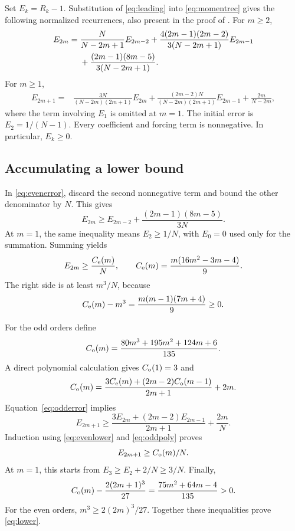 \documentclass[11pt]{article}
\theoremstyle{definition}
\theoremstyle{remark}
\newcommand{\1}{\mathbf 1}
\begin{document}
Set $E_k=R_k-1$. Substitution of \eqref{eq:leading} into \eqref{eq:momentrec} gives the following normalized recurrences, also present in the proof of \cite[Proposition 3.3]{CN}. For $m\ge2$,
\begin{align}
E_{2m}={}&\frac{N}{N-2m+1}E_{2m-2}
+\frac{4(2m-1)(2m-2)}{3(N-2m+1)}E_{2m-1}\notag\\
&+\frac{(2m-1)(8m-5)}{3(N-2m+1)}.\label{eq:evenerror}
\end{align}
For $m\ge1$,
\begin{align}
E_{2m+1}={}&\frac{3N}{(N-2m)(2m+1)}E_{2m}
+\frac{(2m-2)N}{(N-2m)(2m+1)}E_{2m-1}
+\frac{2m}{N-2m},\label{eq:odderror}
\end{align}
where the term involving $E_1$ is omitted at $m=1$. The initial error is $E_2=1/(N-1)$. Every coefficient and forcing term is nonnegative. In particular, $E_k\ge0$.

\subsection{Accumulating a lower bound}

In \eqref{eq:evenerror}, discard the second nonnegative term and bound the other denominator by $N$. This gives
\[
E_{2m}\ge E_{2m-2}+\frac{(2m-1)(8m-5)}{3N}.
\]
At $m=1$, the same inequality means $E_2\ge1/N$, with $E_0=0$ used only for the summation. Summing yields
\begin{equation}\label{eq:evenlower}
E_{2m}\ge\frac{C_{\rm e}(m)}N,
\qquad C_{\rm e}(m)=\frac{m(16m^2-3m-4)}9.
\end{equation}
The right side is at least $m^3/N$, because
\[
C_{\rm e}(m)-m^3=\frac{m(m-1)(7m+4)}9\ge0.
\]

For the odd orders define
\[
C_{\rm o}(m)=\frac{80m^3+195m^2+124m+6}{135}.
\]
A direct polynomial calculation gives $C_{\rm o}(1)=3$ and
\begin{equation}\label{eq:oddpoly}
C_{\rm o}(m)=\frac{3C_{\rm e}(m)+(2m-2)C_{\rm o}(m-1)}{2m+1}+2m.
\end{equation}
Equation~\eqref{eq:odderror} implies
\[
E_{2m+1}\ge\frac{3E_{2m}+(2m-2)E_{2m-1}}{2m+1}+\frac{2m}N.
\]
Induction using \eqref{eq:evenlower} and \eqref{eq:oddpoly} proves
\begin{equation}\label{eq:oddlower}
E_{2m+1}\ge C_{\rm o}(m)/N.
\end{equation}
At $m=1$, this starts from $E_3\ge E_2+2/N\ge3/N$. Finally,
\[
C_{\rm o}(m)-\frac{2(2m+1)^3}{27}
=\frac{75m^2+64m-4}{135}>0.
\]
For the even orders, $m^3\ge2(2m)^3/27$. Together these inequalities prove \eqref{eq:lower}.
\end{document}
